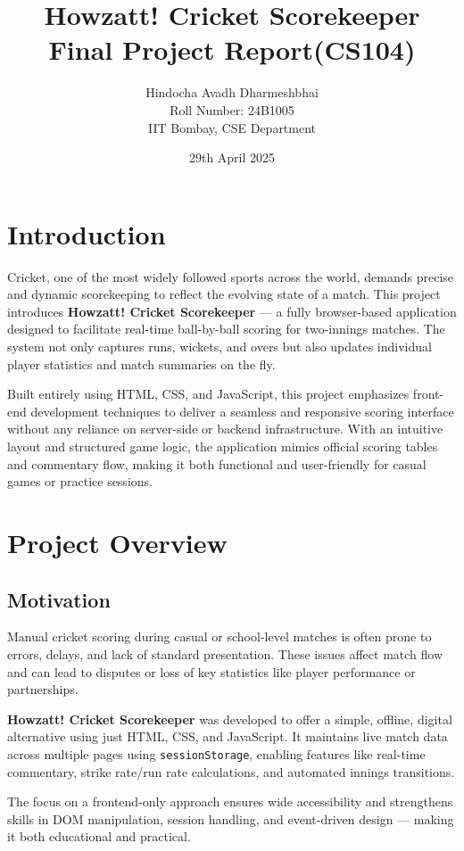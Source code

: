 \documentclass[a4paper,10pt]{article}
\title{\textbf{Howzatt! Cricket Scorekeeper}\\\large Final Project Report(CS104)}
\author{Hindocha Avadh Dharmeshbhai \\ Roll Number: 24B1005 \\ IIT Bombay, CSE Department}
\date{29th April 2025}
\begin{document}
\maketitle

\tableofcontents
\newpage

\section{Introduction}
Cricket, one of the most widely followed sports across the world, demands precise and dynamic scorekeeping to reflect the evolving state of a match. This project introduces \textbf{Howzatt! Cricket Scorekeeper} — a fully browser-based application designed to facilitate real-time ball-by-ball scoring for two-innings matches. The system not only captures runs, wickets, and overs but also updates individual player statistics and match summaries on the fly.

Built entirely using HTML, CSS, and JavaScript, this project emphasizes front-end development techniques to deliver a seamless and responsive scoring interface without any reliance on server-side or backend infrastructure. With an intuitive layout and structured game logic, the application mimics official scoring tables and commentary flow, making it both functional and user-friendly for casual games or practice sessions.



\section{Project Overview}
\subsection{Motivation}
Manual cricket scoring during casual or school-level matches is often prone to errors, delays, and lack of standard presentation. These issues affect match flow and can lead to disputes or loss of key statistics like player performance or partnerships.

\textbf{Howzatt! Cricket Scorekeeper} was developed to offer a simple, offline, digital alternative using just HTML, CSS, and JavaScript. It maintains live match data across multiple pages using \texttt{sessionStorage}, enabling features like real-time commentary, strike rate/run rate calculations, and automated innings transitions.

The focus on a frontend-only approach ensures wide accessibility and strengthens skills in DOM manipulation, session handling, and event-driven design — making it both educational and practical.
\end{document}
